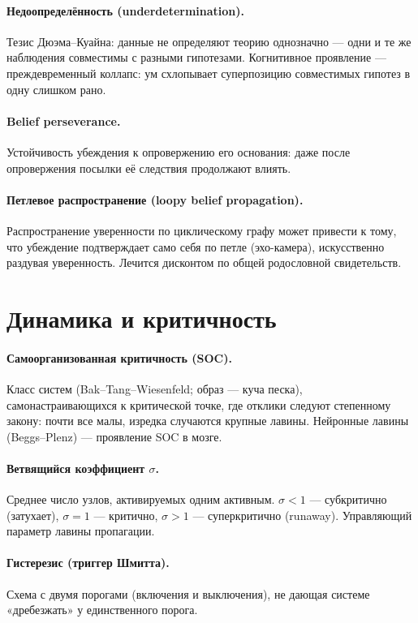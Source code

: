 \paragraph{Недоопределённость (underdetermination).} Тезис Дюэма–Куайна: данные не
определяют теорию однозначно — одни и те же наблюдения совместимы с разными
гипотезами. Когнитивное проявление — преждевременный коллапс: ум схлопывает
суперпозицию совместимых гипотез в одну слишком рано.

\paragraph{Belief perseverance.} Устойчивость убеждения к опровержению его
основания: даже после опровержения посылки её следствия продолжают влиять.

\paragraph{Петлевое распространение (loopy belief propagation).} Распространение
уверенности по циклическому графу может привести к тому, что убеждение подтверждает
само себя по петле (эхо-камера), искусственно раздувая уверенность. Лечится
дисконтом по общей родословной свидетельств.

\section*{Динамика и критичность}

\paragraph{Самоорганизованная критичность (SOC).} Класс систем (Bak–Tang–Wiesenfeld;
образ — куча песка), самонастраивающихся к критической точке, где отклики следуют
степенному закону: почти все малы, изредка случаются крупные лавины. Нейронные
лавины (Beggs–Plenz) — проявление SOC в мозге.

\paragraph{Ветвящийся коэффициент $\sigma$.} Среднее число узлов, активируемых
одним активным. $\sigma<1$ — субкритично (затухает), $\sigma=1$ — критично,
$\sigma>1$ — суперкритично (runaway). Управляющий параметр лавины пропагации.

\paragraph{Гистерезис (триггер Шмитта).} Схема с двумя порогами (включения и
выключения), не дающая системе «дребезжать» у единственного порога.

